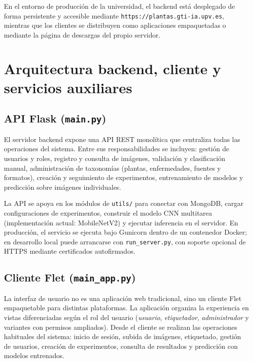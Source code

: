 \documentclass[11pt,spanish,listoffigures,listoftables]{tfgetsinf}
\begin{document}
En el entorno de producción de la universidad, el backend está desplegado de forma persistente y accesible mediante \texttt{https://plantas.gti-ia.upv.es}, mientras que los clientes se distribuyen como aplicaciones empaquetadas o mediante la página de descargas del propio servidor.

\section{Arquitectura backend, cliente y servicios auxiliares}

\subsection{API Flask (\texttt{main.py})}

El servidor backend expone una API REST monolítica que centraliza todas las operaciones del sistema. Entre sus responsabilidades se incluyen: gestión de usuarios y roles, registro y consulta de imágenes, validación y clasificación manual, administración de taxonomías (plantas, enfermedades, fuentes y formatos), creación y seguimiento de experimentos, entrenamiento de modelos y predicción sobre imágenes individuales.

La API se apoya en los módulos de \texttt{utils/} para conectar con MongoDB, cargar configuraciones de experimentos, construir el modelo CNN multitarea (implementación actual: MobileNetV2) y ejecutar inferencia en el servidor. En producción, el servicio se ejecuta bajo Gunicorn dentro de un contenedor Docker; en desarrollo local puede arrancarse con \texttt{run\_server.py}, con soporte opcional de HTTPS mediante certificados autofirmados.

\subsection{Cliente Flet (\texttt{main\_app.py})}

La interfaz de usuario no es una aplicación web tradicional, sino un cliente Flet empaquetable para distintas plataformas. La aplicación organiza la experiencia en vistas diferenciadas según el rol del usuario (\textit{usuario}, \textit{etiquetador}, \textit{administrador} y variantes con permisos ampliados). Desde el cliente se realizan las operaciones habituales del sistema: inicio de sesión, subida de imágenes, etiquetado, gestión de usuarios, creación de experimentos, consulta de resultados y predicción con modelos entrenados.
\end{document}
